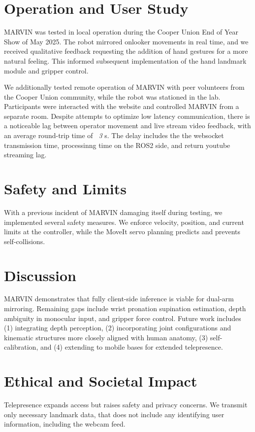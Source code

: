 \documentclass[acmsmall, screen]{acmart}
\begin{document}
\section{Operation and User Study}
MARVIN was tested in local operation during the Cooper Union End of Year Show of May 2025. The robot mirrored onlooker movements in real time, and we received qualitative feedback requesting the addition of hand gestures for a more natural feeling. This informed subsequent implementation of the hand landmark module and gripper control. 

We additionally tested remote operation of MARVIN with peer volunteers from the Cooper Union community, while the robot was stationed in the lab. Participants were interacted with the website and controlled MARVIN from a separate room. Despite attempts to optimize low latency communication, there is a noticeable lag between operator movement and live stream video feedback, with an average round-trip time of \textit{~3} s. The delay includes the the websocket transmission time, processinng time on the ROS2 side, and return youtube streaming lag.

\section{Safety and Limits}
With a previous incident of MARVIN damaging itself during testing, we implemented several safety measures. We enforce velocity, position, and current limits at the controller, while the MoveIt servo planning predicts and prevents self-collisions.

\section{Discussion}
MARVIN demonstrates that fully client-side inference is viable for dual-arm mirroring. Remaining gaps include wrist pronation supination estimation, depth ambiguity in monocular input, and gripper force control. Future work includes (1) integrating depth perception, (2) incorporating joint configurations and kinematic structures more closely aligned with human anatomy, (3) self-calibration, and (4) extending to mobile bases for extended telepresence.

\section{Ethical and Societal Impact}
Telepresence expands access but raises safety and privacy concerns. We transmit only necessary landmark data, that does not include any identifying user information, including the webcam feed.
\end{document}
